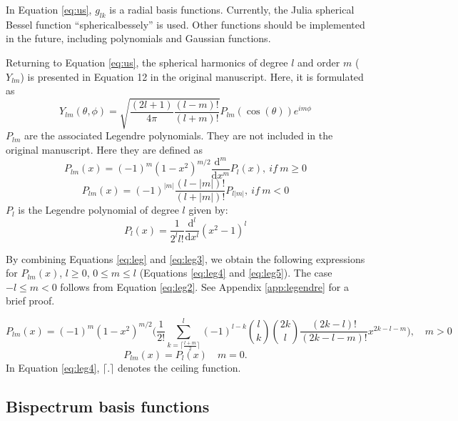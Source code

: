 \documentclass[12pt]{article}
\begin{document}
In Equation \ref{eq:us}, $g_{lk}$ is a radial basis functions. Currently, the Julia spherical Bessel function ``sphericalbessely'' is used. Other functions should be implemented in the future, including polynomials and Gaussian functions.

Returning to Equation \ref{eq:us}, the spherical harmonics of degree $l$ and order $m$ ($Y_{lm}$) is presented in Equation 12 in the original manuscript. Here, it is formulated as
\begin{equation}
 Y_{lm}(\theta,\phi) = \sqrt{\frac{(2l + 1)}{4 \pi} \frac{(l-m)!}{(l+m)!}} P_{lm}(\cos(\theta)) e^{i m \phi}
\end{equation}
$P_{lm}$ are the associated Legendre polynomials. They are not included in the original manuscript. Here they are defined as
\begin{equation}
    \label{eq:leg}
    P_{lm}(x) = (-1)^m (1-x^2)^{m/2}  \frac{\mathrm{d}^m}{\mathrm{d}x^m} P_l(x), \ if \ m \ge 0
\end{equation}
\begin{equation}
    \label{eq:leg2}
    P_{lm} (x) = (-1)^{|m|} \frac{(l-|m|)!}{(l+|m|)!} P_{l|m|}, \ if \ m < 0
\end{equation}
$P_l$ is the Legendre polynomial of degree $l$ given by:
\begin{equation}
    \label{eq:leg3}
    P_l(x)=\frac{1}{2^l l!} \frac{\mathrm{d}^l}{\mathrm{d}x^l}(x^2-1)^l
\end{equation}

By combining Equations \ref{eq:leg} and \ref{eq:leg3}, we obtain the following expressions for $P_{lm}(x)$, $l \ge 0$, $0 \le m \le l$ (Equations \ref{eq:leg4} and \ref{eq:leg5}). The case $-l \le m <0$ follows from Equation \ref{eq:leg2}. See Appendix \ref{app:legendre} for a brief proof.

\begin{equation}
    \label{eq:leg4}
    P_{lm}(x) = (-1)^m (1-x^2)^{m/2} \Bigg( \frac{1}{2!} \sum_{k=\lceil \frac{l+m}{2} \rceil}^l  (-1)^{l-k} {l \choose k} {2k \choose l} \frac{(2k-l)!}{(2k-l-m)!} x^{2k-l-m} \Bigg), \quad m >0
\end{equation}
\begin{equation}
    \label{eq:leg5}
    P_{lm}(x) = P_l(x)  \quad m = 0.
\end{equation} 
In Equation \ref{eq:leg4}, $\lceil . \rceil$ denotes the ceiling function.

\subsection{Bispectrum basis functions}
\end{document}
